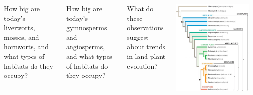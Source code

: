 \begin{frame}
    \begin{adjustwidth}{-2em}{-1.5em}

        \vspace{-3mm}
        \begin{columns}
        

        {\small
            How big are today's liverworts, mosses, and hornworts, and what
            types of habitats do they occupy?


                \vspace{4mm}
            How big are today's gymnosperms and angiosperms, and what types of
            habitats do they occupy?


                \vspace{4mm}
            What do these observations suggest about trends in land plant
            evolution?

        }


        \includegraphics[width=\columnwidth]{plant-phylogeny.png}

        \end{columns}
    \end{adjustwidth}
\end{frame}

